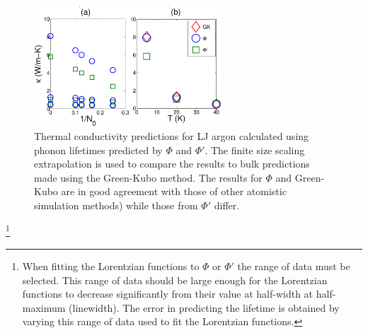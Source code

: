 \documentclass[letterpaper,12pt]{article}
\begin{document}
\begin{figure}
\includegraphics[angle=0,width=70.0mm]{LJ_NMD_SED_COND_2.eps}
\caption{\label{F:LJ_COND} Thermal conductivity predictions for LJ argon calculated using phonon lifetimes predicted by $\Phi$ and $\Phi'$. The finite size scaling extrapolation \cite{turney2009a,sellan2010a} is used to compare the results to bulk predictions made using the Green-Kubo method. The results for $\Phi$ and Green-Kubo are in good agreement with those of other atomistic simulation methods\cite{turney2009a}) while those from $\Phi'$ differ.}
\end{figure}

\vspace*{20mm}
\footnote[1]{When fitting the Lorentzian functions to $\Phi$ or $\Phi'$ the range of data must be selected. This range of data should be large enough for the Lorentzian functions to decrease significantly from their value at half-width at half-maximum (linewidth). The error in predicting the lifetime is obtained by varying this range of data used to fit the Lorentzian functions.}


\end{document}
